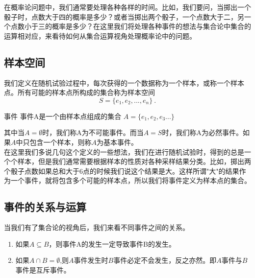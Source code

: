 
\begin{issues}
\issueTODO
\end{issues}

在概率论问题中，我们通常要处理各种各样的时间。比如，我们要问，当掷出一个骰子时，点数大于四的概率是多少？或者当掷出两个骰子，一个点数大于二，另一个点数小于三的概率是多少？在这里我们将处理各种事件的想法与集合论中集合的运算相对应，来看待如何从集合运算视角处理概率论中的问题。
\subsection{样本空间}
我们定义在随机试验过程中，每次获得的一个数据称为一个样本，或称一个样本点。所有可能的样本点所构成的集合称为样本空间
\begin{equation}
S = \{e_1,e_2,...,e_n\}~.
\end{equation}
\begin{definition}{事件}
事件A是一个由样本点组成的集合 $A = \{e_1,e_2,e_3...\}$
\end{definition}
其中当$A= \emptyset $时，我们称A为不可能事件。而当$A=S$时，我们称A为必然事件。如果$A$中只包含一个样本，则称$A$为基本事件。\\
在这里我们多说几句这个定义的一些想法，我们在进行随机试验时，得到的总是一个个样本，但是我们通常需要根据样本的性质对各种采样结果分类。比如，掷出两个骰子点数如果总和大于6点的时候我们说这个结果是大。这样所谓"大"的结果作为一个事件，就将包含多个可能的样本点，所以我们将事件定义为样本点的集合。
\subsection{事件的关系与运算}
当我们有了集合论的视角后，我们来看不同事件之间的关系。
\begin{enumerate}
\item 如果$A\subseteq B$，则事件A的发生一定导致事件B的发生。
\item 如果$A \cap B = \emptyset$,则$A$事件发生时$B$事件必定不会发生，反之亦然。即$A$事件与$B$事件是互斥事件。
\end{enumerate}

